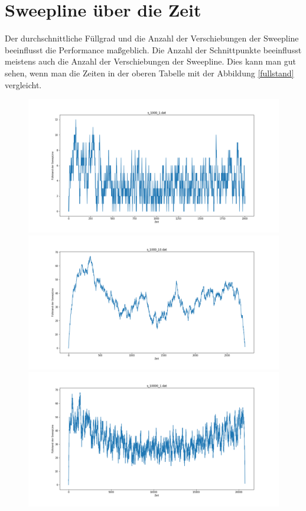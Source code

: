 \documentclass[conference]{IEEEtran}
\begin{document}
	
	\section{Sweepline über die Zeit}
	Der durchschnittliche Füllgrad und die Anzahl der Verschiebungen der Sweepline beeinflusst die Performance maßgeblich. Die Anzahl der Schnittpunkte beeinflusst meistens auch die Anzahl der Verschiebungen der Sweepline. Dies kann man gut sehen, wenn man die Zeiten in der oberen Tabelle mit der Abbildung \ref{fullstand} vergleicht. 

	\begin{figure}[!tbp]
		\centering
		\begin{minipage}[b]{0.5\textwidth}
			\includegraphics[width=\textwidth]{s1000+1.png}
		\end{minipage}
		\hfill
		\begin{minipage}[b]{0.5\textwidth}
			\includegraphics[width=\textwidth]{s1000+10.png}
		\end{minipage}
		\hfill
		\begin{minipage}[b]{0.5\textwidth}
			\includegraphics[width=\textwidth]{s10000+1.png}

\end{minipage}
\end{figure}
\end{document}
